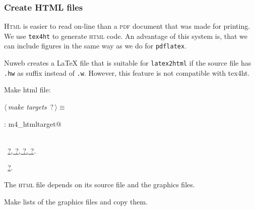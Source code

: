 \documentclass[twoside]{artikel3}
\newcommand{\pdf}{\textsc{pdf}}
\newcommand{\HTML}{\textsc{html}}
\renewcommand{\NWlink}[2]{\hyperlink{#1}{#2}}
\renewcommand{\NWtarget}[2]{\hypertarget{#1}{#2}}
\renewcommand{\NWsep}{$\diamond$\rule[-1\baselineskip]{0pt}{1\baselineskip}}
\renewcommand{\NWlink}[2]{\hyperlink{#1}{#2}}
\renewcommand{\NWtarget}[2]{\hypertarget{#1}{#2}}
\begin{document}
\subsubsection{Create HTML files}
\label{sec:createhtml}

\textsc{Html} is easier to read on-line than a \pdf{} document that
was made for printing. We use \verb|tex4ht| to generate \HTML{}
code. An advantage of this system is, that we can include figures
in the same way as we do for \verb|pdflatex|.

Nuweb creates a \LaTeX{} file that is suitable
for \verb|latex2html| if the source file has \verb|.hw| as suffix instead of
\verb|.w|. However, this feature is not compatible with tex4ht.

Make html file:

\begin{flushleft} \small
\begin{minipage}{\linewidth}\label{scrap28}\raggedright\small
\NWtarget{nuweb?}{} $\langle\,${\itshape make targets}\nobreak\ {\footnotesize {?}}$\,\rangle\equiv$
\vspace{-1ex}
\begin{list}{}{} \item
\mbox{}\verb@html : m4_htmltarget@\\
\mbox{}\verb@@\\
\mbox{}\verb@@{\NWsep}
\end{list}
\vspace{-1.5ex}
\footnotesize
\begin{list}{}{\setlength{\itemsep}{-\parsep}\setlength{\itemindent}{-\leftmargin}}
\item \NWtxtMacroDefBy\ \NWlink{nuweb?}{?}\NWlink{nuweb?}{, ?}\NWlink{nuweb?}{, ?}\NWlink{nuweb?}{, ?}.
\item \NWtxtMacroRefIn\ \NWlink{nuweb?}{?}.

\item{}
\end{list}
\end{minipage}\vspace{4ex}
\end{flushleft}
The \HTML{} file depends on its source file and the graphics files.

Make lists of the graphics files and copy them.
\end{document}
